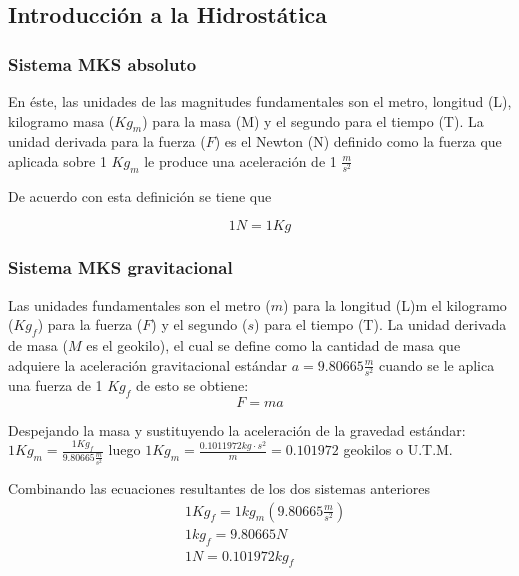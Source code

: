 
\subsection{Introducción a la Hidrostática}

\subsubsection{Sistema MKS absoluto}

En éste, las unidades de las magnitudes fundamentales son el metro, longitud (L), kilogramo masa ($Kg_m$)
para la masa (M) y el segundo para el tiempo (T). La unidad derivada para la fuerza ($F$) es el Newton (N) definido como la fuerza que aplicada sobre 1 $Kg_m$ le produce una aceleración de 1 $\frac{m}{s^2}$

De acuerdo con esta definición se tiene que

\begin{equation}
    1N=1Kg
\end{equation}

\subsubsection{Sistema MKS gravitacional}

Las unidades fundamentales son el metro ($m$) para la longitud (L)m el kilogramo ($Kg_f$) para la fuerza ($F$) y el segundo ($s$) para el tiempo (T).
La unidad derivada de masa ($M$ es el geokilo), el cual se define como la cantidad de masa que adquiere la aceleración gravitacional estándar $a=9.80665\frac{m}{s^2}$ cuando se le aplica una fuerza de 1 $Kg_f$ de esto se obtiene: 
\begin{equation}
    F=ma
\end{equation}

Despejando la masa y sustituyendo la aceleración de la gravedad estándar: $1Kg_m=\frac{1Kg_f}{9.80665 \frac{m}{s^2}}$ luego $1Kg_m=\frac{0.1011972kg\cdot s^2}{m}=0.101972$ geokilos o U.T.M.

Combinando las ecuaciones resultantes de los dos sistemas anteriores
\begin{align*}
    &1Kg_f=1kg_m\left(9.80665\frac{m}{s^2}\right)\\
    &1kg_f=9.80665N\\
    &1N=0.101972kg_f
\end{align*}

